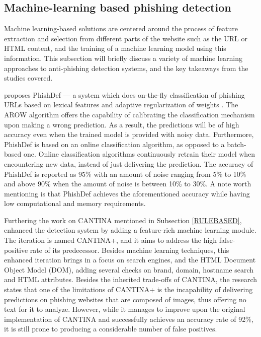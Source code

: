 \subsection{Machine-learning based phishing detection}

Machine learning-based solutions are centered around the process of feature
extraction and selection from different parts of the website such as the URL or
HTML content, and the training of a machine learning model using this
information. This subsection will briefly discuss a variety of machine learning
approaches to anti-phishing detection systems, and the key takeaways from the
studies covered.

\cite{URL_SAYS_ALL} proposes PhishDef --- a system which does on-the-fly
classification of phishing URLs based on lexical features and adaptive
regularization of weights \citep{AROW}. The AROW algorithm offers the capability
of calibrating the classification mechanism upon making a wrong prediction. As a
result, the predictions will be of high accuracy even when the trained model is
provided with noisy data. Furthermore, PhishDef is based on an online
classification algorithm, as opposed to a batch-based one. Online classification
algorithms continuously retrain their model when encountering new data, instead
of just delivering the prediction. The accuracy of PhishDef is reported as 95\%
with an amount of noise ranging from 5\% to 10\% and above 90\% when the amount
of noise is between 10\% to 30\%. A note worth mentioning is that PhishDef
achieves the aforementioned accuracy while having low computational and memory
requirements.

Furthering the work on CANTINA mentioned in Subsection \ref{RULEBASED},
\cite{CANTINA+} enhanced the detection system by adding a feature-rich machine
learning module. The iteration is named CANTINA+, and it aims to address the
high false-positive rate of its predecessor. Besides machine learning
techniques, this enhanced iteration brings in a focus on search engines, and the
HTML Document Object Model (DOM), adding several checks on brand, domain,
hostname search and HTML attributes. Besides the inherited trade-offs of
CANTINA, the research states that one of the limitations of CANTINA+ is the
incapability of delivering predictions on phishing websites that are composed of
images, thus offering no text for it to analyze. However, while it manages to
improve upon the original implementation of CANTINA and successfully achieves an
accuracy rate of 92\%, it is still prone to producing a considerable number of
false positives.


